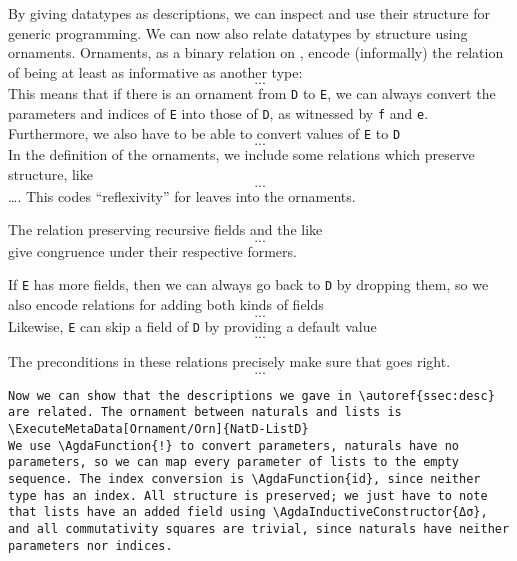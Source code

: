 By giving datatypes as descriptions, we can inspect and use their structure for generic programming. We can now also relate datatypes by structure using ornaments. Ornaments, as a binary relation on , encode (informally) the relation of being at least as informative as another type:
\[ ... \]
This means that if there is an ornament from \texttt{D} to \texttt{E}, we can always convert the parameters and indices of \texttt{E} into those of \texttt{D}, as witnessed by \texttt{f} and \texttt{e}. Furthermore, we also have to be able to convert values of \texttt{E} to \texttt{D}
\[ ... \] 
In the definition of the ornaments, we include some relations which preserve structure, like
\[ ... \]
\dots. This codes ``reflexivity'' for leaves into the ornaments.

The relation preserving recursive fields and the like
\[ ... \] 
give congruence under their respective formers.

If \texttt{E} has more fields, then we can always go back to \texttt{D} by dropping them, so we also encode relations for adding both kinds of fields
\[ ... \]
Likewise, \texttt{E} can skip a field of \texttt{D} by providing a default value
\[ ... \]

The preconditions in these relations precisely make sure that  goes right.
\[ ... \]

\begin{verbatim}
Now we can show that the descriptions we gave in \autoref{ssec:desc} are related. The ornament between naturals and lists is
\ExecuteMetaData[Ornament/Orn]{NatD-ListD}
We use \AgdaFunction{!} to convert parameters, naturals have no parameters, so we can map every parameter of lists to the empty sequence. The index conversion is \AgdaFunction{id}, since neither type has an index. All structure is preserved; we just have to note that lists have an added field using \AgdaInductiveConstructor{Δσ}, and all commutativity squares are trivial, since naturals have neither parameters nor indices.
\end{verbatim}